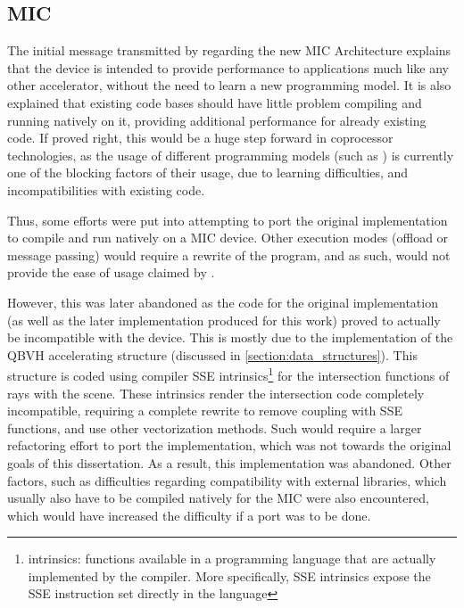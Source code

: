 \documentclass[main.tex]{subfiles}
\begin{document}
\subsection{MIC} \label{section:impl_mic}

The initial message transmitted by \intel regarding the new \acs{MIC} Architecture explains that the device is intended to provide performance to applications much like any other accelerator, without the need to learn a new programming model. It is also explained that existing code bases should have little problem compiling and running natively on it, providing additional performance for already existing \cpu code.
If proved right, this would be a huge step forward in coprocessor technologies, as the usage of different programming models (such as \cuda) is currently one of the blocking factors of their usage, due to learning difficulties, and incompatibilities with existing code.

Thus, some efforts were put into attempting to port the original implementation to compile and run natively on a \ac{MIC} device. Other execution modes (offload or message passing) would require a rewrite of the program, and as such, would not provide the ease of usage claimed by \intel.

However, this was later abandoned as the code for the original implementation (as well as the later \cpu implementation produced for this work) proved to actually be incompatible with the device. This is mostly due to the implementation of the \acs{QBVH} accelerating structure (discussed in \cref{section:data_structures}). This structure is coded using compiler \acs{SSE} intrinsics\footnote{intrinsics: functions available in a programming language that are actually implemented by the compiler. More specifically, \acs{SSE} intrinsics expose the \acs{SSE} instruction set directly in the language} for the intersection functions of rays with the scene.
These intrinsics render the intersection code completely incompatible, requiring a complete rewrite to remove coupling with \acs{SSE} functions, and use other vectorization methods. Such would require a larger refactoring effort to port the implementation, which was not towards the original goals of this dissertation. As a result, this implementation was abandoned.
Other factors, such as difficulties regarding compatibility with external libraries, which usually also have to be compiled natively for the \acs{MIC} were also encountered, which would have increased the difficulty if a port was to be done.
\end{document}
